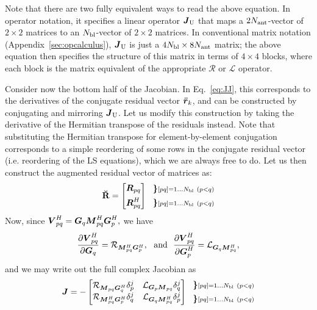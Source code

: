 \documentclass[useAMS,usenatbib]{mn2e}
\makeatletter
\newcommand{\rrc}{\bmath{\bar r}}
\newcommand{\mat}[1]{{\bmath{#1}}}
\newcommand{\JJ}{\mat{J}} %
\newcommand{\MM}{\mat{M}}
\newcommand{\RR}{\mat{R}}
\newcommand{\VV}{\mat{V}}
\newcommand{\GG}{\mat{G}}
\newcommand{\Matrix}[2]{\left [ \begin{array}{@{}#1@{}}#2\end{array} \right ]}
\newcommand{\Stack}[1]{\begin{array}{@{}c@{}}#1\end{array}}
\newcommand{\AUGx}[1]{\mathbf{\breve{#1}}}
\newcommand{\RRr}{\AUGx{R}}
\newcommand{\TOP}{\mathrm{U}}%
\newcommand{\Rop}[1]{\mathcal{R}_{{#1}}}
\newcommand{\Lop}[1]{\mathcal{L}_{{#1}}}
\numberwithin{equation}{section}
\makeatother
\begin{document}
Note that there are two fully equivalent ways to read the above equation. In operator notation, it specifies a linear 
operator $\JJ_\TOP$ that maps a $2N_\mathrm{ant}$-vector of $2\times2$ matrices to an $N_\mathrm{bl}$-vector of $2\times2$ matrices. In
conventional matrix notation (Appendix~\ref{sec:opcalculus}), $\JJ_\TOP$ is just a $4N_\mathrm{bl}\times8N_\mathrm{ant}$ matrix; 
the above equation then specifies the structure of this matrix in terms of $4\times4$ blocks, where each block 
is the matrix equivalent of the appropriate $\mathcal{R}$ or $\mathcal{L}$ operator.

Consider now the bottom half of the Jacobian. In Eq.~\ref{eq:JJ}, this corresponds to the derivatives of the conjugate
residual vector $\rrc_k$, and can be constructed by conjugating and mirroring $\JJ_\TOP$. Let us modify this construction 
by taking the derivative of the Hermitian transpose of the residuals instead. Note that substituting the Hermitian transpose 
for element-by-element conjugation corresponds to a simple reordering of some rows in the conjugate residual vector (i.e.
reordering of the LS equations), which we are always free to do. Let us then construct the augmented residual vector of matrices as:
\begin{equation}
\RRr = 
\Matrix{c}{
  \RR_{pq} \\[1ex] 
  \RR^H_{pq} 
} 
~~ 
\Stack{ 
\bm{\}} \scriptstyle [pq]=1\dots \Nbl~(p<q) \\[1ex] 
\bm{\}} \scriptstyle [pq]=1\dots \Nbl~(p<q) 
}
\label{eq:RRtranspose}
\end{equation}
Now, since $\VV^H_{pq}=\GG_q \MM^H_{pq} \GG^H_p,$ we have
\begin{equation}
\label{eq:dRH:dG}
\frac{\partial\VV^H_{pq}}{\partial\GG_q} = \Rop{\MM^H_{pq}\GG^H_p},\mathrm{~~and~~}
\frac{\partial\VV^H_{pq}}{\partial\GG^H_p} = \Lop{\GG_q \MM^H_{pq}},
\end{equation}
and we may write out the full complex Jacobian as
\begin{equation}
\JJ = - \Matrix{cc}{ 
\Rop{ \MM_{pq}\GG^H_q }\delta^j_p & 
\Lop{ \GG_p \MM_{pq}  }\delta^j_q \\
\Rop{ \MM^H_{pq} \GG^H_p } \delta^j_q & 
\Lop{ \GG_q \MM^H_{pq}  } \delta^j_p  
}~~ 
\Stack{ 
\bm{\}} \scriptstyle [pq]=1\dots \Nbl~(p<q) \\[1ex] 
\bm{\}} \scriptstyle [pq]=1\dots \Nbl~(p<q) 
}
\end{equation}
\end{document}
